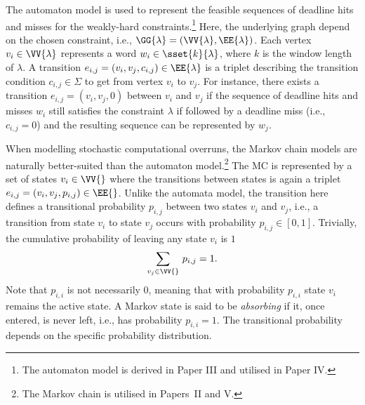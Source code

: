 The automaton model is used to represent the feasible sequences of deadline hits and misses for the weakly-hard constraints.\footnote{The automaton model is derived in Paper III and utilised in Paper IV.}
Here, the underlying graph depend on the chosen constraint, i.e., $\GG{\lambda} = (\VV{\lambda}, \EE{\lambda})$.
Each vertex $v_i \in \VV{\lambda}$ represents a word $w_i \in \sset{k}{\lambda}$, where $k$ is the window length of $\lambda$.
A transition $e_{i, j} = (v_i, v_j, c_{i,j}) \in \EE{\lambda}$ is a triplet describing the transition condition $c_{i,j} \in \Sigma$ to get from vertex $v_i$ to $v_j$.
For instance, there exists a transition $e_{i,j} = (v_i, v_j, 0)$ between $v_i$ and $v_j$ if the sequence of deadline hits and misses $w_i$ still satisfies the constraint $\lambda$ if followed by a deadline miss (i.e., $c_{i,j} = 0$) and the resulting sequence can be represented by $w_j$.

When modelling stochastic computational overruns, the Markov chain models are naturally better-suited than the automaton model.\footnote{The Markov chain is utilised in Papers~II and V.}
The MC is represented by a set of states $v_i \in \VV{}$ where the transitions between states is again a triplet $e_{i, j} = (v_i, v_j, p_{i, j}) \in \EE{}$.
Unlike the automata model, the transition here defines a transitional probability $p_{i, j}$ between two states $v_i$ and $v_j$, i.e., a transition from state $v_i$ to state $v_j$ occurs with probability $p_{i, j} \in [0, 1]$.
Trivially, the cumulative probability of leaving any state $v_i$ is $1$
%
\begin{equation*}
    \sum_{v_j\in\VV{}}\, p_{i, j} = 1.
\end{equation*}
%
Note that $p_{i, i}$ is not necessarily $0$, meaning that with probability $p_{i, i}$ state $v_i$ remains the active state.
A Markov state is said to be \emph{absorbing} if it, once entered, is never left, i.e., has probability $p_{i, i} = 1$.
The transitional probability depends on the specific probability distribution.

